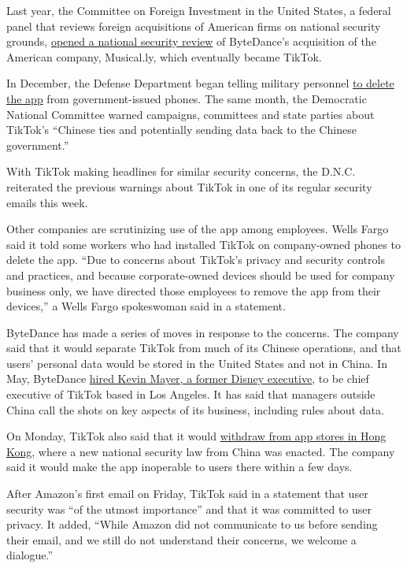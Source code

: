 Last year, the Committee on Foreign Investment in the United States, a
federal panel that reviews foreign acquisitions of American firms on
national security grounds,
\href{https://www.nytimes.com/2019/11/01/technology/tiktok-national-security-review.html}{opened
a national security review} of ByteDance's acquisition of the American
company, Musical.ly, which eventually became TikTok.

In December, the Defense Department began telling military personnel
\href{https://www.nytimes.com/2020/01/04/us/tiktok-pentagon-military-ban.html}{to
delete the app} from government-issued phones. The same month, the
Democratic National Committee warned campaigns, committees and state
parties about TikTok's ``Chinese ties and potentially sending data back
to the Chinese government.''

With TikTok making headlines for similar security concerns, the D.N.C.
reiterated the previous warnings about TikTok in one of its regular
security emails this week.

Other companies are scrutinizing use of the app among employees. Wells
Fargo said it told some workers who had installed TikTok on
company-owned phones to delete the app. ``Due to concerns about TikTok's
privacy and security controls and practices, and because corporate-owned
devices should be used for company business only, we have directed those
employees to remove the app from their devices,'' a Wells Fargo
spokeswoman said in a statement.

ByteDance has made a series of moves in response to the concerns. The
company said that it would separate TikTok from much of its Chinese
operations, and that users' personal data would be stored in the United
States and not in China. In May, ByteDance
\href{https://www.nytimes.com/2020/05/18/business/media/tiktok-ceo-kevin-mayer.html}{hired
Kevin Mayer, a former Disney executive}, to be chief executive of TikTok
based in Los Angeles. It has said that managers outside China call the
shots on key aspects of its business, including rules about data.

On Monday, TikTok also said that it would
\href{https://www.nytimes.com/2020/07/07/business/hong-kong-security-law-tech.html}{withdraw
from app stores in Hong Kong}, where a new national security law from
China was enacted. The company said it would make the app inoperable to
users there within a few days.

After Amazon's first email on Friday, TikTok said in a statement that
user security was ``of the utmost importance'' and that it was committed
to user privacy. It added, ``While Amazon did not communicate to us
before sending their email, and we still do not understand their
concerns, we welcome a dialogue.''

